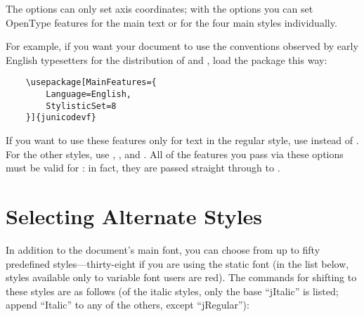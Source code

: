 The  options can only set axis coordinates; with the  
options you can
set OpenType features for the main text or for the four main styles individually.

For example, if you want your document to use the conventions observed by early
English typesetters for the distribution of  and , load the
package this way:

\footnotesize
\begin{verbatim}
    \usepackage[MainFeatures={
        Language=English,
        StylisticSet=8
    }]{junicodevf}
\end{verbatim}
\normalsize

\noindent If you want to use these features only for text in the regular style, use
 instead of . For the other styles, use
, , and .
All of the
features you pass via these options must be valid for \fspec: in fact,
they are passed straight through to \fspec.

\section{Selecting Alternate Styles}

In addition to the document's main font, you can choose from up to fifty
predefined styles---thirty-eight if you are using the static font (in the list below,
styles available only to variable font users are {\color{BrickRed}red}).
The commands for shifting to these
styles are as follows (of the italic styles, only the base “jItalic” is listed;
append “Italic” to any of the others, except “jRegular”):

